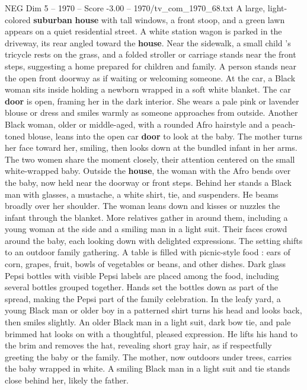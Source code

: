 \begin{textsample}{NEG Dim 5 – 1970 – Score -3.00 – 1970/tv\_com\_1970\_68.txt}  \label{ex:f5_neg_001}
A large, light-colored \textbf{suburban} \textbf{house} with tall windows, a front stoop, and a green lawn appears on a quiet residential street.
A white station wagon is parked in the driveway, its rear angled toward the \textbf{house}.
Near the sidewalk, a small child ’s tricycle rests on the grass, and a folded stroller or carriage stands near the front steps, suggesting a home prepared for children and family.
A person stands near the open front doorway as if waiting or welcoming someone.
At the car, a Black woman sits inside holding a newborn wrapped in a soft white blanket.
The car \textbf{door} is open, framing her in the dark interior.
She wears a pale pink or lavender blouse or dress and smiles warmly as someone approaches from outside.
Another Black woman, older or middle-aged, with a rounded Afro hairstyle and a peach-toned blouse, leans into the open car \textbf{door} to look at the baby.
The mother turns her face toward her, smiling, then looks down at the bundled infant in her arms.
The two women share the moment closely, their attention centered on the small white-wrapped baby.
Outside the \textbf{house}, the woman with the Afro bends over the baby, now held near the doorway or front steps.
Behind her stands a Black man with glasses, a mustache, a white shirt, tie, and suspenders.
He beams broadly over her shoulder.
The woman leans down and kisses or nuzzles the infant through the blanket.
More relatives gather in around them, including a young woman at the side and a smiling man in a light suit.
Their faces crowd around the baby, each looking down with delighted expressions.
The setting shifts to an outdoor family gathering.
A table is filled with picnic-style food : ears of corn, grapes, fruit, bowls of vegetables or beans, and other dishes.
Dark glass Pepsi bottles with visible Pepsi labels are placed among the food, including several bottles grouped together.
Hands set the bottles down as part of the spread, making the Pepsi part of the family celebration.
In the leafy yard, a young Black man or older boy in a patterned shirt turns his head and looks back, then smiles slightly.
An older Black man in a light suit, dark bow tie, and pale brimmed hat looks on with a thoughtful, pleased expression.
He lifts his hand to the brim and removes the hat, revealing short gray hair, as if respectfully greeting the baby or the family.
The mother, now outdoors under trees, carries the baby wrapped in white.
A smiling Black man in a light suit and tie stands close behind her, likely the father.

\end{textsample}
